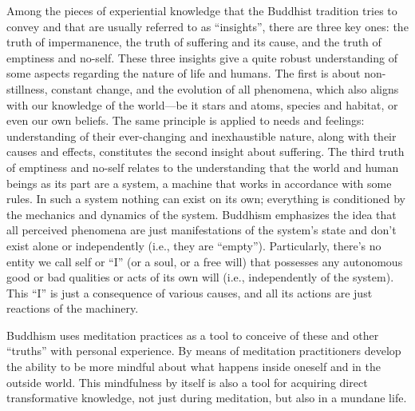 \documentclass[12pt]{report}
\begin{document}
\noindent Among the pieces of experiential knowledge that the Buddhist tradition tries to convey and that are usually referred to as ``insights'', there are three key ones: the truth of impermanence, the truth of suffering and its cause, and the truth of emptiness and no-self. These three insights give a quite robust understanding of some aspects regarding the nature of life and humans. The first is about non-stillness, constant change, and the evolution of all phenomena, which also aligns with our knowledge of the world\thinspace---\thinspace be it stars and atoms, species and habitat, or even our own beliefs. The same principle is applied to needs and feelings: understanding of their ever-changing and inexhaustible nature, along with their causes and effects, constitutes the second insight about suffering. The third truth of emptiness and no-self relates to the understanding that the world and human beings as its part are a system, a machine that works in accordance with some rules. In such a system nothing can exist on its own; everything is conditioned by the mechanics and dynamics of the system. Buddhism emphasizes the idea that all perceived phenomena are just manifestations of the system’s state and don’t exist alone or independently (i.e., they are ``empty''). Particularly, there’s no entity we call self or ``I'' (or a soul, or a free will) that possesses any autonomous good or bad qualities or acts of its own will (i.e., independently of the system). This ``I'' is just a consequence of various causes, and all its actions are just reactions of the machinery.

\noindent Buddhism uses meditation practices as a tool to conceive of these and other ``truths'' with personal experience. By means of meditation practitioners develop the ability to be more mindful about what happens inside oneself and in the outside world. This mindfulness by itself is also a tool for acquiring direct transformative knowledge, not just during meditation, but also in a mundane life.
\end{document}
